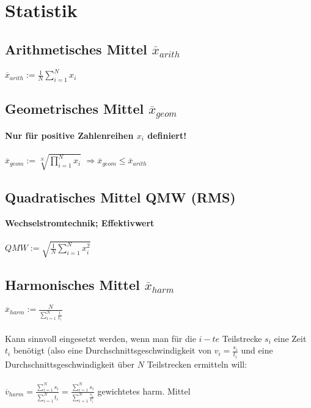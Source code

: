 \section{Statistik}
	\subsection{Arithmetisches Mittel $\overline{x}_{arith}$}
		
	$\overline{x}_{arith} := \frac{1}{N} \sum \limits_{i = 1}^N  x_i$
	
		
		
	\subsection{Geometrisches Mittel $\overline{x}_{geom}$}
	\textbf{Nur für positive Zahlenreihen $x_i$ definiert!} \\
	\\		
	$\overline{x}_{geom} := \sqrt[N]{\prod \limits_{i = 1}^N  x_i }$ \qquad \qquad $\Rightarrow \overline{x}_{geom} \leq \overline{x}_{arith}$
		
		
		
	\subsection{Quadratisches Mittel QMW (RMS)}
	\textbf{Wechselstromtechnik; Effektivwert} \\
	\\
	$QMW := \sqrt{ \frac{1}{N} \sum \limits_{i = 1}^N  x_i^2 }$
		
		
	\subsection{Harmonisches Mittel $\overline{x}_{harm}$}		
	
	$\overline{x}_{harm} := \frac{N}{ \sum \limits_{i = 1}^N   \frac{1}{x_i} } $ \\
	\\
	Kann sinnvoll eingesetzt werden, wenn man für die $i-te$ Teilstrecke $s_i$ eine Zeit $t_i$ benötigt (also eine Durchschnittsgeschwindigkeit von $v_i = \frac{s_i}{t_i}$ und eine Durchschnittsgeschwindigkeit über $N$ Teilstrecken ermitteln will: \\
	\\
	$\overline{v}_{harm} = \frac{\sum \limits_{i = 1}^N  s_i }{\sum \limits_{i = 1}^N  t_i} = \frac{\sum \limits_{i = 1}^N  s_i }{\sum \limits_{i = 1}^N \frac{s_i}{v_i} }  $ \qquad gewichtetes harm. Mittel
		
